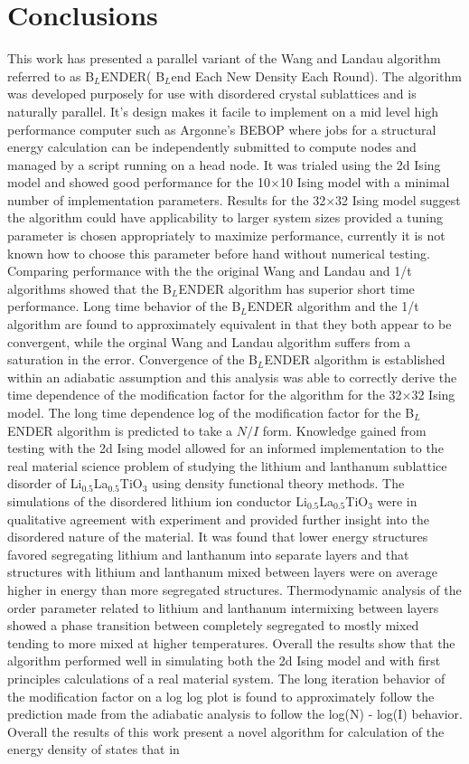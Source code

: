 \documentclass[aps,pre,reprint,superscriptaddress,showkeys]{revtex4-2}
\begin{document}
\section{Conclusions}
\label{sec5}
 This work has presented a parallel variant of the Wang and Landau algorithm referred to as B$_L$ENDER( B$_L$end Each New Density Each Round). The algorithm was developed purposely for use with disordered crystal sublattices and is naturally parallel. It's design makes it facile to implement on a mid level high performance computer such as Argonne's BEBOP where jobs for a structural energy calculation can be independently submitted to compute nodes  and managed by a script running on a head node. It was trialed using the 2d Ising model and showed good performance for the 10$\times$10 Ising model with a minimal number of implementation parameters. Results for the 32$\times$32 Ising model suggest the algorithm could have applicability to larger system sizes provided a tuning parameter is chosen appropriately to maximize performance, currently it is not known how to choose this parameter before hand without numerical testing. Comparing performance with the the original Wang and Landau and 1/t algorithms showed that the B$_L$ENDER algorithm has superior short time performance. Long time behavior of the B$_L$ENDER algorithm and the 1/t algorithm  are found to approximately equivalent in that they both appear to be convergent, while the orginal Wang and Landau algorithm suffers from a saturation in the error.  Convergence of the B$_L$ENDER algorithm is established within an adiabatic assumption and this analysis was able to correctly derive the time dependence of the modification factor for the algorithm for the 32$\times$32 Ising model. The long time dependence log of the modification factor for the B$_L$ENDER algorithm is predicted to take a $N/I$ form.  Knowledge gained from testing with the 2d Ising model allowed for an informed implementation to the real material science problem of studying the lithium and lanthanum sublattice disorder of Li$_{0.5}$La$_{0.5}$TiO$_{3}$ using density functional theory methods. The simulations of the disordered lithium ion conductor Li$_{0.5}$La$_{0.5}$TiO$_{3}$ were in qualitative agreement with experiment and provided further insight into the disordered nature of the material. It was found that lower energy structures favored segregating lithium and lanthanum into separate layers and that structures with lithium and lanthanum mixed between layers were on average higher in energy than more segregated structures. Thermodynamic analysis of the order parameter related to lithium and lanthanum intermixing between layers showed a phase transition between completely segregated  to mostly mixed tending to more mixed at higher temperatures. Overall the results show that the algorithm performed well in simulating both the 2d Ising model and with first principles calculations of a real material system. The long iteration behavior of the modification factor  on a log log plot is found to approximately follow  the prediction made from the adiabatic analysis to follow the log(N) - log(I) behavior. Overall the results of this work present a novel algorithm for calculation of the energy density of states that in 
\end{document}
